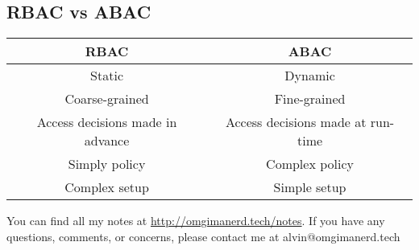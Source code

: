 \documentclass{math}
\begin{document}
\subsection*{RBAC vs ABAC}
\begin{center}
  \begin{tabular}{|c|c|}
    \hline
    \textbf{RBAC} & \textbf{ABAC} \\
    \hline
    Static & Dynamic \\
    Coarse-grained & Fine-grained \\
    Access decisions made in advance & Access decisions made at run-time \\
    Simply policy & Complex policy \\
    Complex setup & Simple setup \\
    \hline
  \end{tabular}
\end{center}

\begin{center}
  You can find all my notes at \url{http://omgimanerd.tech/notes}. If you have
  any questions, comments, or concerns, please contact me at
  alvin@omgimanerd.tech
\end{center}
\end{document}
